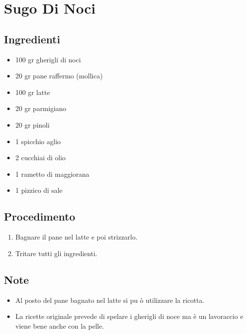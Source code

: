 \section{Sugo Di Noci}
\subsection{Ingredienti}
\begin{itemize}
\item 100 gr gherigli di noci  
\item 20 gr pane raffermo (mollica)  
\item 100 gr latte  
\item 20 gr parmigiano  
\item 20 gr pinoli   
\item 1 spicchio aglio  
\item 2 cucchiai di olio  
\item 1 rametto di maggiorana  
\item 1 pizzico di sale
\end{itemize}
\subsection{Procedimento}
\begin{enumerate}
\item  Bagnare il pane nel latte e poi strizzarlo.  
\item  Tritare tutti gli ingredienti.
\end{enumerate}
\subsection{Note}
\begin{itemize}
\item Al posto del pane bagnato nel latte si pu ò utilizzare la ricotta.  
\item La ricette originale prevede di spelare i gherigli di noce ma è un lavoraccio e viene bene anche con la pelle.
\end{itemize}
